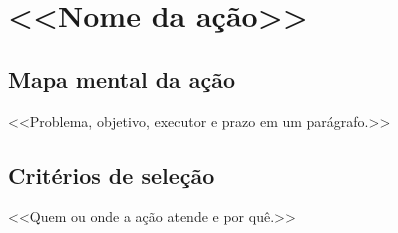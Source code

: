 %
%
\chapter{<<Nome da ação>>}

\section{Mapa mental da ação}
<<Problema, objetivo, executor e prazo em um parágrafo.>>

\section{Critérios de seleção}
<<Quem ou onde a ação atende e por quê.>>

